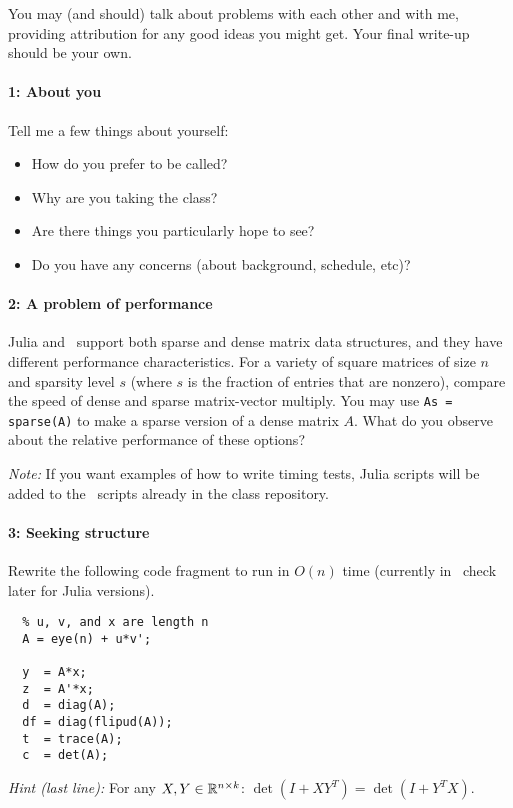 \documentclass[12pt, leqno]{article} %
\begin{document}

You may (and should) talk about problems with each other and with me,
providing attribution for any good ideas you might get.  Your final
write-up should be your own.

\paragraph*{1: About you}
Tell me a few things about yourself:
\begin{itemize}
\item How do you prefer to be called?
\item Why are you taking the class?
\item Are there things you particularly hope to see?
\item Do you have any concerns (about background, schedule, etc)?
\end{itemize}

\paragraph*{2: A problem of performance}
Julia and \matlab\ support both sparse and dense matrix data structures,
and they have different performance characteristics.  For a variety
of square matrices of size $n$ and sparsity level $s$ (where $s$ is
the fraction of entries that are nonzero), compare the speed of dense
and sparse matrix-vector multiply.  You may use {\tt As = sparse(A)}
to make a sparse version of a dense matrix $A$.  What do you observe
about the relative performance of these options?

{\em Note:} If you want examples of how to write timing tests, Julia
scripts will be added to the \matlab\ scripts already in the class
repository.

\paragraph*{3: Seeking structure}
Rewrite the following code fragment to run in $O(n)$ time
(currently in \matlab\, check later for Julia versions).
\begin{lstlisting}
  % u, v, and x are length n
  A = eye(n) + u*v';
  
  y  = A*x;
  z  = A'*x;
  d  = diag(A);
  df = diag(flipud(A));
  t  = trace(A);
  c  = det(A);
\end{lstlisting}

{\em Hint (last line):} For any $X, Y \in \mathbb{R}^{n \times k}$:
$\det(I+XY^T) = \det(I+Y^T X)$.
\end{document}
